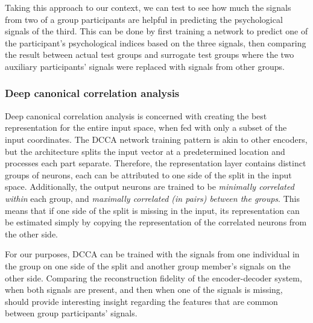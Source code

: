 \documentclass[a4paper, 11pt]{article}      %
\begin{document}
Taking this approach to our context, we can test to see how much the signals from two of a group participants are helpful in predicting the psychological signals of the third. This can be done by first training a network to predict one of the participant's psychological indices based on the three signals, then comparing the result between actual test groups and surrogate test groups where the two auxiliary participants' signals were replaced with signals from other groups.


\subsubsection{Deep canonical correlation analysis}
Deep canonical correlation analysis \cite{andrew2013deep} is concerned with creating the best representation for the entire input space, when fed with only a subset of the input coordinates. The DCCA network training pattern is akin to other encoders, but the architecture splits the input vector at a predetermined location and processes each part separate. Therefore, the representation layer contains distinct groups of neurons, each can be attributed to one side of the split in the input space. Additionally, the output neurons are trained to be \emph{minimally correlated within} each group, and \emph{maximally correlated (in pairs) between the groups}. This means that if one side of the split is missing in the input, its representation can be estimated simply by copying the representation of the correlated neurons from the other side.

For our purposes, DCCA can be trained with the signals from one individual in the group on one side of the split and another group member's signals on the other side. Comparing the reconstruction fidelity of the encoder-decoder system, when both signals are present, and then when one of the signals is missing, should provide interesting insight regarding the features that are common between group participants' signals.





\end{document}
